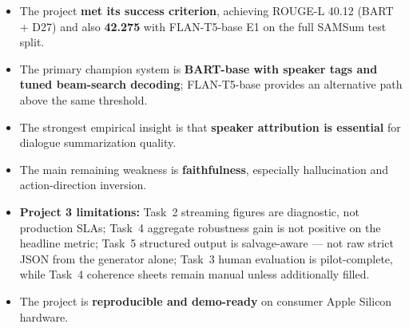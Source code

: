 \documentclass[11pt,a4paper]{article}
\newcommand{\tightitem}{\setlength\itemsep{2pt}\setlength\parskip{0pt}}
\begin{document}
\begin{itemize}\tightitem
\item The project \textbf{met its success criterion}, achieving ROUGE-L 40.12 (BART + D27) and also \textbf{42.275} with FLAN-T5-base E1 on the full SAMSum test split.
\item The primary champion system is \textbf{BART-base with speaker tags and tuned beam-search decoding}; FLAN-T5-base provides an alternative path above the same threshold.
\item The strongest empirical insight is that \textbf{speaker attribution is essential} for dialogue summarization quality.
\item The main remaining weakness is \textbf{faithfulness}, especially hallucination and action-direction inversion.
\item \textbf{Project 3 limitations:} Task~2 streaming figures are diagnostic, not production SLAs; Task~4 aggregate robustness gain is not positive on the headline metric; Task~5 structured output is salvage-aware --- not raw strict JSON from the generator alone; Task~3 human evaluation is pilot-complete, while Task~4 coherence sheets remain manual unless additionally filled.
\item The project is \textbf{reproducible and demo-ready} on consumer Apple Silicon hardware.
\end{itemize}

\vspace{6pt}
\end{document}
